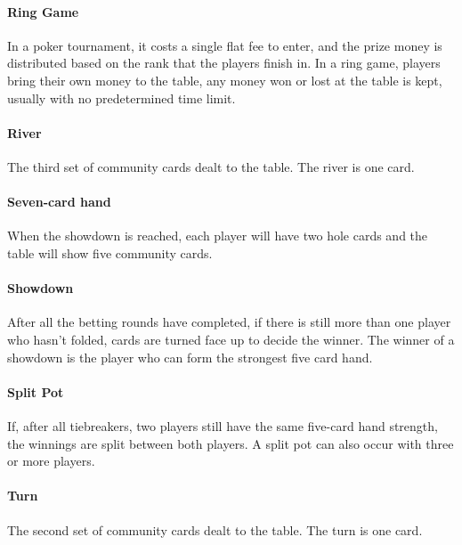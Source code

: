 \paragraph*{Ring Game} In a poker tournament, it costs a single flat fee to enter, and the prize money is distributed based on the rank that the players finish in. In a ring game, players bring their own money to the table, any money won or lost at the table is kept, usually with no predetermined time limit.
 
\paragraph*{River} The third set of community cards dealt to the table. The river is one card.

\paragraph*{Seven-card hand} When the showdown is reached, each player will have two hole cards and the table will show five community cards.

\paragraph*{Showdown} After all the betting rounds have completed, if there is still more than one player who hasn't folded, cards are turned face up to decide the winner. The winner of a showdown is the player who can form the strongest five card hand.

\paragraph*{Split Pot} If, after all tiebreakers, two players still have the same five-card hand strength, the winnings are split between both players. A split pot can also occur with three or more players.

\paragraph*{Turn} The second set of community cards dealt to the table. The turn is one card.





\clearpage



\begin{flushleft}



\end{flushleft}
\clearpage


